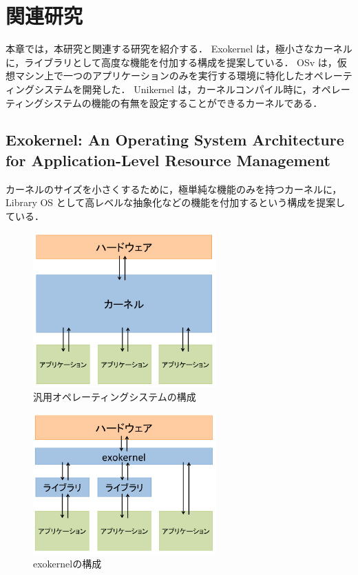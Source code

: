 \documentclass[graduation-thesis]{mlarticle}
\begin{document}
\clearpage
\section {関連研究}
\label{relative}

本章では，本研究と関連する研究を紹介する．
Exokernel は，極小さなカーネルに，ライブラリとして高度な機能を付加する構成を提案している．
OSv は，仮想マシン上で一つのアプリケーションのみを実行する環境に特化したオペレーティングシステムを開発した．
Unikernel は，カーネルコンパイル時に，オペレーティングシステムの機能の有無を設定することができるカーネルである．

\subsection {Exokernel: An Operating System Architecture for Application-Level Resource Management}
\label{relarive:exokernel}
カーネルのサイズを小さくするために，極単純な機能のみを持つカーネルに，Library OS として高レベルな抽象化などの機能を付加するという構成を提案している．

\begin{figure}[H]
  \begin{center}
    \includegraphics[width=7.0cm]{images/generalos.png}
    \caption{汎用オペレーティングシステムの構成}
    \label{fig:generalos}
  \end{center}
\end{figure}
\begin{figure}[H]
  \begin{center}
    \includegraphics[width=7.0cm]{images/exokernel.png}
    \caption{exokernelの構成}
    \label{fig:exokernel}
  \end{center}
\end{figure}
\end{document}
